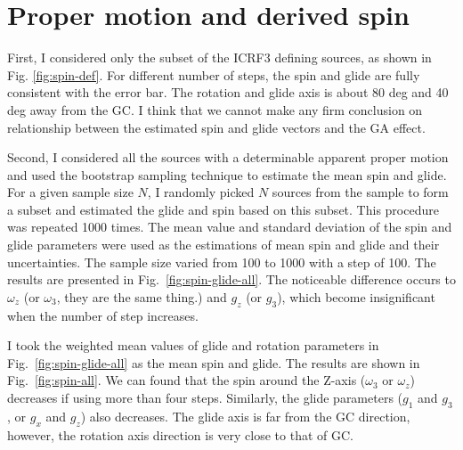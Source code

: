 \documentclass{aa-note}    %
\begin{document}


\section{Proper motion and derived spin}     \label{sec:spin}

First, I considered only the subset of the ICRF3 defining sources, as shown in Fig. \ref{fig:spin-def}. 
For different number of steps, the spin and glide are fully consistent with the error bar. 
The rotation and glide axis is about 80 deg and 40 deg away from the GC. 
I think that we cannot make any firm conclusion on relationship between the estimated spin and glide vectors and the GA effect.

Second, I considered all the sources with a determinable apparent proper motion and used the bootstrap sampling technique to estimate the mean spin and glide. 
For a given sample size $N$, I randomly picked $N$ sources from the sample to form a subset and estimated the glide and spin based on this subset. 
This procedure was repeated 1000 times.
The mean value and standard deviation of the spin and glide parameters were used as the estimations of mean spin and glide and their uncertainties.
The sample size varied from 100 to 1000 with a step of 100.
The results are presented in Fig.~\ref{fig:spin-glide-all}.
The noticeable difference occurs to $\omega_z$ (or $\omega_3$, they are the same thing.) and $g_z$ (or $g_3$), which become insignificant when the number of step increases.

I took the weighted mean values of glide and rotation parameters in Fig.~\ref{fig:spin-glide-all} as the mean spin and glide.
The results are shown in Fig.~\ref{fig:spin-all}. 
We can found that the spin around the Z-axis ($\omega_3$ or $\omega_z$) decreases if using more than four steps. 
Similarly, the glide parameters ($g_1$ and $g_3$, or $g_x$ and $g_z$) also decreases. 
The glide axis is far from the GC direction, however, the rotation axis direction is very close to that of GC. 
\end{document}
